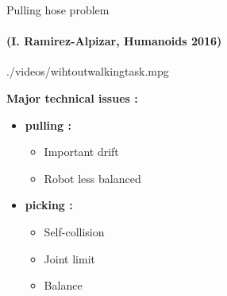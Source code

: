 \begin{frame}{Pulling hose problem}
\framesubtitle{
  \textcolor{green!30!black!80}
  {
    (I. Ramirez-Alpizar, Humanoids 2016)
  }
}
%
  \begin{center}
    {./videos/wihtoutwalkingtask.mpg}\\
  \end{center}
  \textbf{\color{txtcolor2} Major technical issues :}\\
  \begin{minipage}{0.48\textwidth}
    \begin{itemize}
      \item \textbf{\color{txtcolor2} pulling :}
      \begin{itemize}
        \item Important drift
        \item Robot less balanced
      \end{itemize}
    \end{itemize}
  \end{minipage}
%    
  \begin{minipage}{0.48\textwidth}
    \begin{itemize}
      \item \textbf{\color{txtcolor2} picking :}
      \begin{itemize}
        \item Self-collision
        \item Joint limit
        \item Balance
      \end{itemize}
    \end{itemize}
  \end{minipage}
%

\end{frame} 
 
